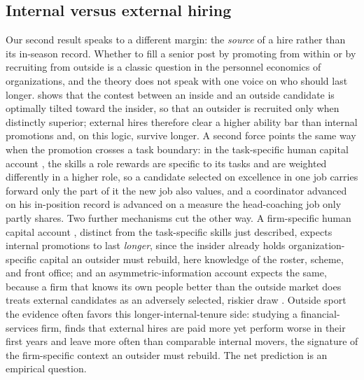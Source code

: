 \documentclass[12pt,USenglish]{article}
\begin{document}
\subsection{Internal versus external hiring}

Our second result speaks to a different margin: the \emph{source} of a hire rather than its in-season record. Whether to fill a senior post by promoting from within or by recruiting from outside is a classic question in the personnel economics of organizations, and the theory does not speak with one voice on who should last longer. \citet{chan1996} shows that the contest between an inside and an outside candidate is optimally tilted toward the insider, so that an outsider is recruited only when distinctly superior; external hires therefore clear a higher ability bar than internal promotions and, on this logic, survive longer. A second force points the same way when the promotion crosses a task boundary: in the task-specific human capital account \citep{gibbonswaldman2004}, the skills a role rewards are specific to its tasks and are weighted differently in a higher role, so a candidate selected on excellence in one job carries forward only the part of it the new job also values, and a coordinator advanced on his in-position record is advanced on a measure the head-coaching job only partly shares. Two further mechanisms cut the other way. A firm-specific human capital account \citep{lazear2009}, distinct from the task-specific skills just described, expects internal promotions to last \emph{longer}, since the insider already holds organization-specific capital an outsider must rebuild, here knowledge of the roster, scheme, and front office; and an asymmetric-information account expects the same, because a firm that knows its own people better than the outside market does treats external candidates as an adversely selected, riskier draw \citep{greenwald1986}. Outside sport the evidence often favors this longer-internal-tenure side: studying a financial-services firm, \citet{bidwell2011} finds that external hires are paid more yet perform worse in their first years and leave more often than comparable internal movers, the signature of the firm-specific context an outsider must rebuild. The net prediction is an empirical question.
\end{document}

